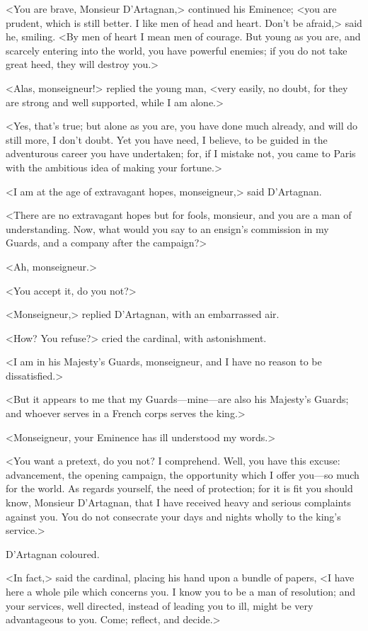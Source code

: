 <You are brave, Monsieur D'Artagnan,> continued his Eminence; <you are prudent, which is still better. I like men of head and heart. Don't be afraid,> said he, smiling. <By men of heart I mean men of courage. But young as you are, and scarcely entering into the world, you have powerful enemies; if you do not take great heed, they will destroy you.> 

<Alas, monseigneur!> replied the young man, <very easily, no doubt, for they are strong and well supported, while I am alone.> 

<Yes, that's true; but alone as you are, you have done much already, and will do still more, I don't doubt. Yet you have need, I believe, to be guided in the adventurous career you have undertaken; for, if I mistake not, you came to Paris with the ambitious idea of making your fortune.> 

<I am at the age of extravagant hopes, monseigneur,> said D'Artagnan. 

<There are no extravagant hopes but for fools, monsieur, and you are a man of understanding. Now, what would you say to an ensign's commission in my Guards, and a company after the campaign?> 

<Ah, monseigneur.> 

<You accept it, do you not?> 

<Monseigneur,> replied D'Artagnan, with an embarrassed air. 

<How? You refuse?> cried the cardinal, with astonishment. 

<I am in his Majesty's Guards, monseigneur, and I have no reason to be dissatisfied.> 

<But it appears to me that my Guards—mine—are also his Majesty's Guards; and whoever serves in a French corps serves the king.> 

<Monseigneur, your Eminence has ill understood my words.> 

<You want a pretext, do you not? I comprehend. Well, you have this excuse: advancement, the opening campaign, the opportunity which I offer you—so much for the world. As regards yourself, the need of protection; for it is fit you should know, Monsieur D'Artagnan, that I have received heavy and serious complaints against you. You do not consecrate your days and nights wholly to the king's service.> 

D'Artagnan coloured. 

<In fact,> said the cardinal, placing his hand upon a bundle of papers, <I have here a whole pile which concerns you. I know you to be a man of resolution; and your services, well directed, instead of leading you to ill, might be very advantageous to you. Come; reflect, and decide.> 

